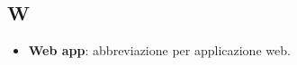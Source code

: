 \subsection{W}
\begin{itemize}
\item \textbf{Web app}: abbreviazione per applicazione web.
\end{itemize}
